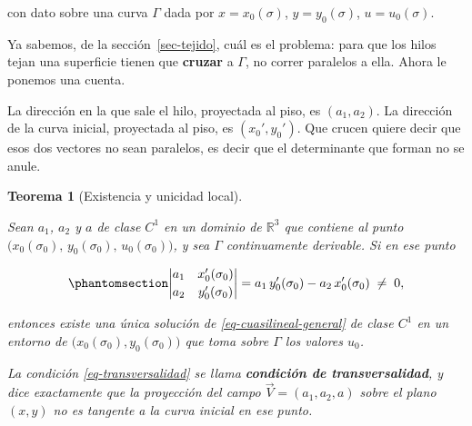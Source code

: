 \documentclass[
  spanish,
  a4paper,
]{scrbook}
\theoremstyle{definition}
\theoremstyle{plain}
\theoremstyle{definition}
\theoremstyle{plain}
\newtheorem{theorem}{Teorema}[chapter]
\theoremstyle{definition}
\theoremstyle{remark}
\begin{document}
con dato sobre una curva \(\Gamma\) dada por \(x = x_0(\sigma)\),
\(y = y_0(\sigma)\), \(u = u_0(\sigma)\).

Ya sabemos, de la sección~\ref{sec-tejido}, cuál es el problema: para
que los hilos tejan una superficie tienen que \textbf{cruzar} a
\(\Gamma\), no correr paralelos a ella. Ahora le ponemos una cuenta.

La dirección en la que sale el hilo, proyectada al piso, es
\((a_1, a_2)\). La dirección de la curva inicial, proyectada al piso, es
\((x_0', y_0')\). Que crucen quiere decir que esos dos vectores no sean
paralelos, es decir que el determinante que forman no se anule.

\begin{theorem}[Existencia y unicidad
local]\protect\hypertarget{thm-transversalidad}{}\label{thm-transversalidad}

Sean \(a_1\), \(a_2\) y \(a\) de clase \(C^1\) en un dominio de
\(\mathbb{R}^3\) que contiene al punto
\(\big(x_0(\sigma_0),\,y_0(\sigma_0),\,u_0(\sigma_0)\big)\), y sea
\(\Gamma\) continuamente derivable. Si en ese punto

\begin{equation}\protect\phantomsection\label{eq-transversalidad}{
\begin{vmatrix}
a_1 & x_0'(\sigma_0)\\[2pt]
a_2 & y_0'(\sigma_0)
\end{vmatrix}
= a_1\,y_0'(\sigma_0) - a_2\,x_0'(\sigma_0) \;\neq\; 0 ,
}\end{equation}

entonces existe una única solución de \ref{eq-cuasilineal-general} de
clase \(C^1\) en un entorno de
\(\big(x_0(\sigma_0), y_0(\sigma_0)\big)\) que toma sobre \(\Gamma\) los
valores \(u_0\).

La condición \ref{eq-transversalidad} se llama \textbf{condición de
transversalidad}, y dice exactamente que la proyección del campo
\(\vec V=(a_1,a_2,a)\) sobre el plano \((x,y)\) no es tangente a la
curva inicial en ese punto.

\end{theorem}
\end{document}
